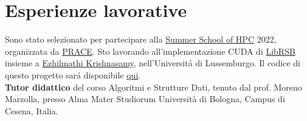 \documentclass[curriculum-vitae-ita]{subfiles}
\begin{document}
	\section*{Esperienze lavorative}
	 Sono stato selezionato per partecipare alla \href{https://summerofhpc.prace-ri.eu/info/}{Summer School of HPC} 2022, organizzata da \href{https://prace-ri.eu/}{PRACE}. Sto lavorando all'implementazione CUDA di \href{http://librsb.sourceforge.net/}{LibRSB} insieme a \href{https://wwwen.uni.lu/snt/people/ezhilmathi_krishnasamy}{Ezhilmathi Krishnasamy}, nell'Universit\'a di Lussemburgo. Il codice di questo progetto sar\'a disponibile \href{https://github.com/Ledmington/cuRSB}{qui}.\\
	
	 \textbf{Tutor didattico} del corso Algoritmi e Strutture Dati, tenuto dal prof. Moreno Marzolla, presso Alma Mater Studiorum Università di Bologna, Campus di Cesena, Italia.
\end{document}
